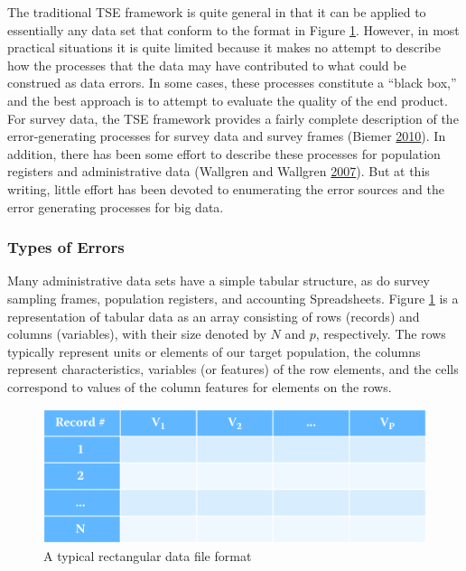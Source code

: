 \documentclass[]{krantz}
\begin{document}
The traditional TSE framework is quite general in that it can be applied
to essentially any data set that conform to the format in Figure
\ref{fig:fig10-1}. However, in most practical situations it is quite
limited because it makes no attempt to describe how the processes that
the data may have contributed to what could be construed as data errors.
In some cases, these processes constitute a ``black box,'' and the best
approach is to attempt to evaluate the quality of the end product. For
survey data, the TSE framework provides a fairly complete description of
the error-generating processes for survey data and survey frames (Biemer
\protect\hyperlink{ref-biemer2010total}{2010}). In addition, there has
been some effort to describe these processes for population registers
and administrative data (Wallgren and Wallgren
\protect\hyperlink{ref-wallgren2007register}{2007}). But at this
writing, little effort has been devoted to enumerating the error sources
and the error generating processes for big data.

\subsubsection{Types of Errors}\label{types-of-errors}

Many administrative data sets have a simple tabular structure, as do
survey sampling frames, population registers, and accounting
Spreadsheets. Figure \ref{fig:fig10-1} is a representation of tabular
data as an array consisting of rows (records) and columns (variables),
with their size denoted by \(N\) and \(p\), respectively. The rows
typically represent units or elements of our target population, the
columns represent characteristics, variables (or features) of the row
elements, and the cells correspond to values of the column features for
elements on the rows.

\begin{figure}

{\centering \includegraphics[width=0.7\linewidth]{ChapterError/figures/fig10-1} 

}

\caption{A typical rectangular data file format}\label{fig:fig10-1}
\end{figure}
\end{document}
